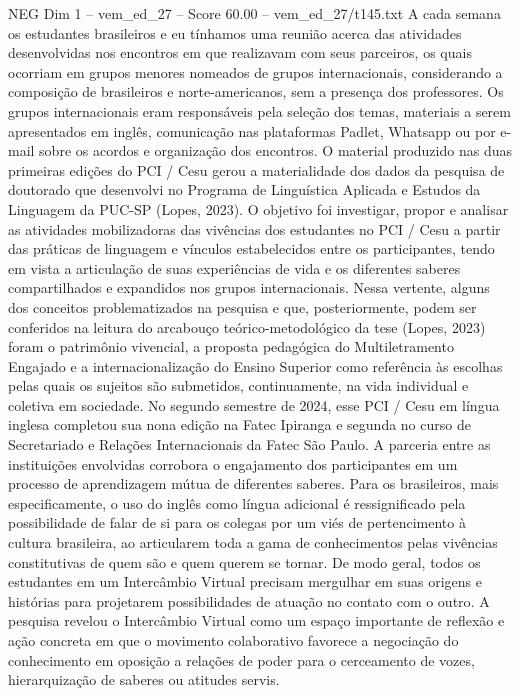 \begin{textsample}{NEG Dim 1 – vem\_ed\_27 – Score 60.00 – vem\_ed\_27/t145.txt}
A cada semana os estudantes brasileiros e eu tínhamos uma reunião acerca das atividades desenvolvidas nos encontros em que realizavam com seus parceiros, os quais ocorriam em grupos menores nomeados de grupos internacionais, considerando a composição de brasileiros e norte-americanos, sem a presença dos professores.
Os grupos internacionais eram responsáveis pela seleção dos temas, materiais a serem apresentados em inglês, comunicação nas plataformas Padlet, Whatsapp ou por e-mail sobre os acordos e organização dos encontros.
O material produzido nas duas primeiras edições do PCI / Cesu gerou a materialidade dos dados da pesquisa de doutorado que desenvolvi no Programa de Linguística Aplicada e Estudos da Linguagem da PUC-SP (Lopes, 2023).
O objetivo foi investigar, propor e analisar as atividades mobilizadoras das vivências dos estudantes no PCI / Cesu a partir das práticas de linguagem e vínculos estabelecidos entre os participantes, tendo em vista a articulação de suas experiências de vida e os diferentes saberes compartilhados e expandidos nos grupos internacionais.
Nessa vertente, alguns dos conceitos problematizados na pesquisa e que, posteriormente, podem ser conferidos na leitura do arcabouço teórico-metodológico da tese (Lopes, 2023) foram o patrimônio vivencial, a proposta pedagógica do Multiletramento Engajado e a internacionalização do Ensino Superior como referência às escolhas pelas quais os sujeitos são submetidos, continuamente, na vida individual e coletiva em sociedade.
No segundo semestre de 2024, esse PCI / Cesu em língua inglesa completou sua nona edição na Fatec Ipiranga e segunda no curso de Secretariado e Relações Internacionais da Fatec São Paulo.
A parceria entre as instituições envolvidas corrobora o engajamento dos participantes em um processo de aprendizagem mútua de diferentes saberes.
Para os brasileiros, mais especificamente, o uso do inglês como língua adicional é ressignificado pela possibilidade de falar de si para os colegas por um viés de pertencimento à cultura brasileira, ao articularem toda a gama de conhecimentos pelas vivências constitutivas de quem são e quem querem se tornar.
De modo geral, todos os estudantes em um Intercâmbio Virtual precisam mergulhar em suas origens e histórias para projetarem possibilidades de atuação no contato com o outro.
A pesquisa revelou o Intercâmbio Virtual como um espaço importante de reflexão e ação concreta em que o movimento colaborativo favorece a negociação do conhecimento em oposição a relações de poder para o cerceamento de vozes, hierarquização de saberes ou atitudes servis.

\end{textsample}
